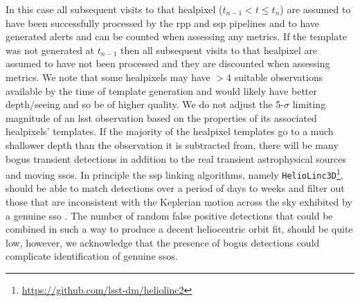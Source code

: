 \documentclass[preprintm,linenumbers]{aastex631}
\newcommand{\deltaNight}{\texttt{deltaNight}\xspace}
\newcommand{\heliolinc}{\texttt{HelioLinc3D}\xspace}
\begin{document}
In this case all subsequent visits to that healpixel ($t_{n-1}< t \leq t_n$) are assumed to have been successfully processed by the \gls*{rpp} and \gls*{ssp} pipelines and to have generated alerts and can be counted when assessing any metrics.
If the template was not generated at $t_{n-1}$ then all subsequent visits to that healpixel are assumed to have not been processed and they are discounted when assessing metrics.
We note that some healpixels may have $>4$ suitable observations available by the time of template generation and would likely have better depth/seeing and so be of higher quality. 
  We do not adjust the 5-$\sigma$ limiting magnitude of an \gls*{lsst} observation based on the properties of its associated healpixels' templates. 
If the majority of the healpixel templates go to a much shallower depth than the observation it is subtracted from, there will be many bogus transient detections in addition to the real transient astrophysical sources and moving \glspl*{sso}. 
In principle the \gls*{ssp} linking algorithms, namely \heliolinc\footnote{\url{https://github.com/lsst-dm/heliolinc2}}, should be able to match detections over a period of days to weeks and filter out those that are inconsistent with the Keplerian motion across the sky exhibited by a genuine \gls*{sso} \citep{holmanHelioLinCNovelApproach2018,heinze2022}.
The number of random false positive detections that could be combined in such a way to produce a decent heliocentric orbit fit, should be quite low, however, we acknowledge that the presence of bogus detections could complicate identification of genuine \glspl*{sso}. 
		
		
\end{document}
